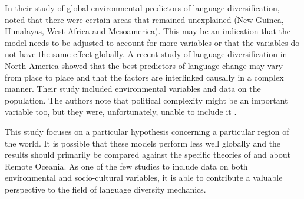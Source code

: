 \documentclass[12pt,letterpaper]{article}
\begin{document}

In their study of global environmental predictors of language diversification, \citet{hua2019ecological} noted that there were certain areas that remained unexplained (New Guinea, Himalayas, West Africa and Mesoamerica). This may be an indication that the model needs to be adjusted to account for more variables or that the variables do not have the same effect globally. A recent study of language diversification in North America \citep{Pacheco_Coelho_2019} showed that the best predictors of language change may vary from place to place and that the factors are interlinked causally in a complex manner. Their study included environmental variables and data on the population. The authors note that political complexity might be an important variable too, but they were, unfortunately, unable to include it \citep[7]{Pacheco_Coelho_2019}.

This study focuses on a particular hypothesis concerning a particular region of the world. It is possible that these models perform less well globally and the results should primarily be compared against the specific theories of \citet{lynch1981melanesian} and \citet{pawley81, pawley2007} about Remote Oceania. As one of the few studies to include data on both environmental and socio-cultural variables, it is able to contribute a valuable perspective to the field of language diversity mechanics.

\FloatBarrier

\end{document}
